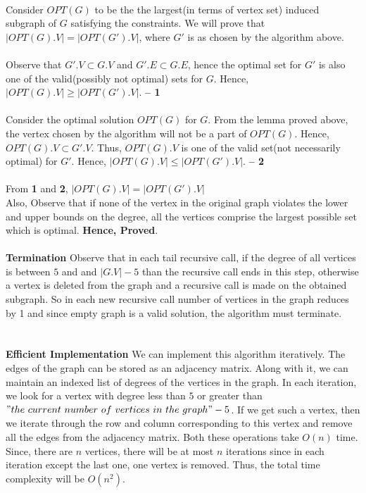 \documentclass[a4paper]{article}
\begin{document}
\\
Consider $OPT(G)$ to be the the largest(in terms of vertex set) induced subgraph of $G$ satisfying the constraints. We will prove that $|OPT(G).V| = |OPT(G').V|$, where $G'$ is as chosen by the algorithm above.\\
\\
Observe that $G'.V \subset G.V$ and $G'.E \subset G.E$, hence the optimal set for $G'$ is also one of the valid(possibly not optimal) sets for $G$. Hence, $|OPT(G).V| \geq |OPT(G').V|$.\textbf{ -- 1} \\
\\
Consider the optimal solution $OPT(G)$ for $G$. From the lemma proved above, the vertex chosen by the algorithm will not be a part of $OPT(G)$. Hence, $OPT(G).V\subset G'.V$. Thus, $OPT(G).V$ is one of the valid set(not necessarily optimal) for $G'$. Hence, $|OPT(G).V| \leq |OPT(G').V|$.  \textbf{ -- 2} \\
\\
From \textbf{1} and \textbf{2}, $|OPT(G).V| = |OPT(G').V|$ \\
Also, Observe that if none of the vertex in the original graph violates the lower and upper bounds on the degree, all the vertices comprise the largest possible set which is optimal. \textbf{Hence, Proved}.\\
\\
\textbf{Termination} Observe that in each tail recursive call, if the degree of all vertices is between $5$ and and $|G.V|-5$ than the recursive call ends in this step, otherwise a vertex is deleted from the graph and a recursive call is made on the obtained subgraph. So in each new recursive call number of vertices in the graph reduces by 1 and since empty graph is a valid solution, the algorithm must terminate. \\
\\

\\
\textbf{Efficient Implementation} We can implement this algorithm iteratively. The edges of the graph can be stored as an adjacency matrix. Along with it, we can maintain an indexed list of degrees of the vertices in the graph. In each iteration, we look for a vertex with degree less than $5$ or greater than $"the\ current\ number\ of\ vertices\ in\ the\ graph" - 5$. If we get such a vertex, then we iterate through the row and column corresponding to this vertex and remove all the edges from the adjacency matrix. Both these operations take $O(n)$ time. Since, there are $n$ vertices, there will be at most $n$ iterations since in each iteration except the last one, one  vertex is removed. Thus, the total time complexity will be $O(n^2)$.\\
\end{document}
